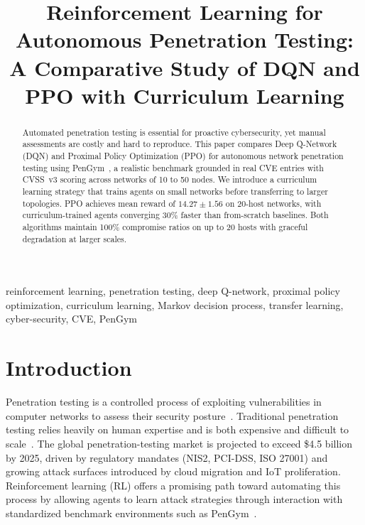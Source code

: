 \documentclass[conference]{IEEEtran}
\title{Reinforcement Learning for Autonomous Penetration Testing:\\
       A Comparative Study of DQN and PPO with Curriculum Learning}
\author{
  \IEEEauthorblockN{Vinay Appajigowda}
  \IEEEauthorblockA{
    Student ID: x24262013\\
    National College of Ireland\\
    Dublin, Ireland\\
    \texttt{x24262013@student.ncirl.ie}
  }
}
\begin{document}
\maketitle

\begin{abstract}
Automated penetration testing is essential for proactive cybersecurity, yet manual assessments are costly and hard to reproduce. This paper compares Deep Q-Network (DQN) and Proximal Policy Optimization (PPO) for autonomous network penetration testing using PenGym~\cite{nguyen2025cose}, a realistic benchmark grounded in real CVE entries with CVSS~v3 scoring across networks of 10 to 50 nodes. We introduce a curriculum learning strategy that trains agents on small networks before transferring to larger topologies. PPO achieves mean reward of $14.27 \pm 1.56$ on 20-host networks, with curriculum-trained agents converging 30\% faster than from-scratch baselines. Both algorithms maintain 100\% compromise ratios on up to 20 hosts with graceful degradation at larger scales.
\end{abstract}

\begin{IEEEkeywords}
reinforcement learning, penetration testing, deep Q-network,
proximal policy optimization, curriculum learning, Markov decision
process, transfer learning, cyber-security, CVE, PenGym
\end{IEEEkeywords}

\section{Introduction}
\label{sec:intro}

Penetration testing is a controlled process of exploiting
vulnerabilities in computer networks to assess their security
posture~\cite{ghanem2023jiis}.  Traditional penetration testing relies
heavily on human expertise and is both expensive and difficult to
scale~\cite{alhamed2025ijacsa}.  The global penetration-testing market
is projected to exceed \$4.5 billion by 2025, driven by regulatory
mandates (NIS2, PCI-DSS, ISO 27001) and growing attack surfaces
introduced by cloud migration and IoT proliferation.  Reinforcement
learning (RL) offers a promising path toward automating this process by
allowing agents to learn attack strategies through interaction with
standardized benchmark environments such as PenGym~\cite{nguyen2025cose,suttonbarto2018}.
\end{document}

